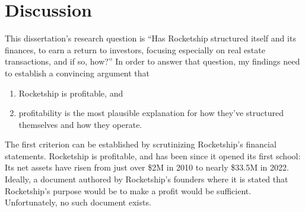 
\chapter{Discussion}\label{ch:discussion}

\begin{comment}
  With sheer repetition, and in the absence of evidence, a myth about K-12 education has taken hold: American public schools are abject failures. Something must be done to reign in the rapacious unions who protect and coddle incompetent teachers. Something must be done about lazy administrators who block progress. Something must be done to give back to parents control over their children's education. And that something is charter schools.

  Rocketship is one of the most successful charter school chains in the United States, but their success is not in educating elementary school children. Case in point: In August 2023, the Fort Worth Star-Telegram reported that only 23\% of Rocketship's students met state standards in reading and language arts \parencite{Allen.Ruiz2023} compared to 53\% statewide \parencite{TexasEducationAgency2023}.

  Instead, Rocketship's success is in making money.
\end{comment}

This dissertation's research question is ``Has Rocketship structured itself and its finances, to earn a return to investors, focusing especially on real estate transactions, and if so, how?'' In order to answer that question, my findings need to establish a convincing argument that
\begin{enumerate}
  \item Rocketship is profitable, and
  \item profitability is the most plausible explanation for how they've structured themselves and how they operate.
\end{enumerate}

The first criterion can be established by scrutinizing Rocketship's financial statements. Rocketship is profitable, and has been since it opened its first school: Its net assets have risen from just over \$2M in 2010 to nearly \$33.5M in 2022. Ideally, a document authored by Rocketship's founders where it is stated that Rocketship's purpose would be to make a profit would be sufficient. Unfortunately, no such document exists.

